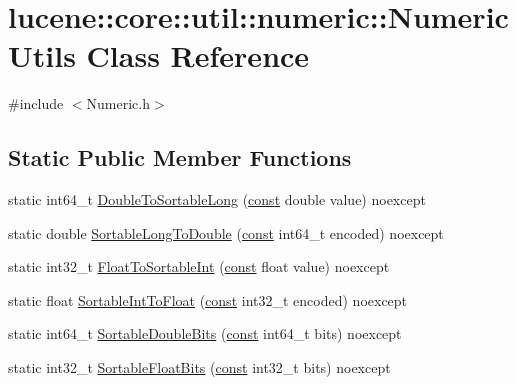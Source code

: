 \hypertarget{classlucene_1_1core_1_1util_1_1numeric_1_1NumericUtils}{}\section{lucene\+:\+:core\+:\+:util\+:\+:numeric\+:\+:Numeric\+Utils Class Reference}
\label{classlucene_1_1core_1_1util_1_1numeric_1_1NumericUtils}


{\ttfamily \#include $<$Numeric.\+h$>$}

\subsection*{Static Public Member Functions}
\begin{DoxyCompactItemize}
\item 
static int64\+\_\+t \mbox{\hyperlink{classlucene_1_1core_1_1util_1_1numeric_1_1NumericUtils_a9d5b85182616a66411692490ad456292}{Double\+To\+Sortable\+Long}} (\mbox{\hyperlink{ZlibCrc32_8h_a2c212835823e3c54a8ab6d95c652660e}{const}} double value) noexcept
\item 
static double \mbox{\hyperlink{classlucene_1_1core_1_1util_1_1numeric_1_1NumericUtils_ae1b4379e1894fbf903e7d9a32f60cfcc}{Sortable\+Long\+To\+Double}} (\mbox{\hyperlink{ZlibCrc32_8h_a2c212835823e3c54a8ab6d95c652660e}{const}} int64\+\_\+t encoded) noexcept
\item 
static int32\+\_\+t \mbox{\hyperlink{classlucene_1_1core_1_1util_1_1numeric_1_1NumericUtils_acf9712f39d7888ce95931e2ca90ac0a5}{Float\+To\+Sortable\+Int}} (\mbox{\hyperlink{ZlibCrc32_8h_a2c212835823e3c54a8ab6d95c652660e}{const}} float value) noexcept
\item 
static float \mbox{\hyperlink{classlucene_1_1core_1_1util_1_1numeric_1_1NumericUtils_a28ea95985c9845332a4c5dee3bd559b1}{Sortable\+Int\+To\+Float}} (\mbox{\hyperlink{ZlibCrc32_8h_a2c212835823e3c54a8ab6d95c652660e}{const}} int32\+\_\+t encoded) noexcept
\item 
static int64\+\_\+t \mbox{\hyperlink{classlucene_1_1core_1_1util_1_1numeric_1_1NumericUtils_aed056d568ae97a28d65df1b95601e6b7}{Sortable\+Double\+Bits}} (\mbox{\hyperlink{ZlibCrc32_8h_a2c212835823e3c54a8ab6d95c652660e}{const}} int64\+\_\+t bits) noexcept
\item 
static int32\+\_\+t \mbox{\hyperlink{classlucene_1_1core_1_1util_1_1numeric_1_1NumericUtils_a8f3be7673ea25e688d9890326b5f54f0}{Sortable\+Float\+Bits}} (\mbox{\hyperlink{ZlibCrc32_8h_a2c212835823e3c54a8ab6d95c652660e}{const}} int32\+\_\+t bits) noexcept

\end{DoxyCompactItemize}
